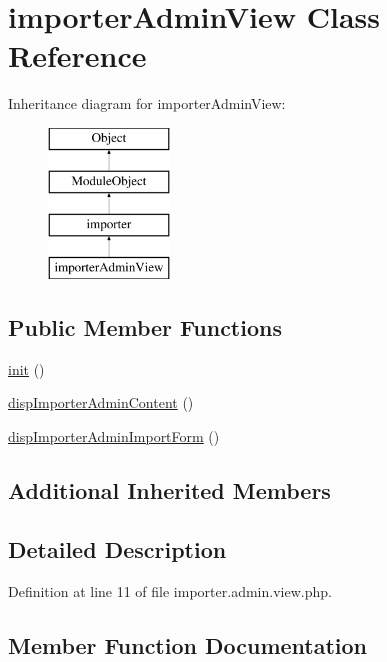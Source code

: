 \hypertarget{classimporterAdminView}{}\section{importer\+Admin\+View Class Reference}
\label{classimporterAdminView}
Inheritance diagram for importer\+Admin\+View\+:\begin{figure}[H]
\begin{center}
\leavevmode
\includegraphics[height=4.000000cm]{classimporterAdminView}
\end{center}
\end{figure}
\subsection*{Public Member Functions}
\begin{DoxyCompactItemize}
\item 
\hyperlink{classimporterAdminView_a80f9a6e2e9051598556993dcbbe8027d}{init} ()
\item 
\hyperlink{classimporterAdminView_acf9cbe2b56436ba34ad0b8221993beba}{disp\+Importer\+Admin\+Content} ()
\item 
\hyperlink{classimporterAdminView_a5b4fa9f27407cc697b65505fafa4fc11}{disp\+Importer\+Admin\+Import\+Form} ()
\end{DoxyCompactItemize}
\subsection*{Additional Inherited Members}


\subsection{Detailed Description}


Definition at line 11 of file importer.\+admin.\+view.\+php.



\subsection{Member Function Documentation}
\mbox{\label{classimporterAdminView_acf9cbe2b56436ba34ad0b8221993beba}} 

